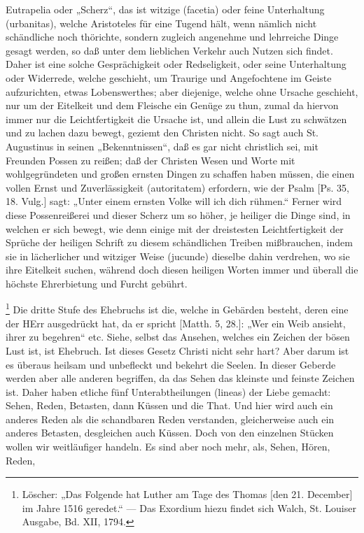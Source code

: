 Eutrapelia oder „Scherz“, das ist witzige (facetia) oder feine Unterhaltung (urbanitas), welche Aristoteles für eine Tugend hält, wenn nämlich nicht schändliche noch thörichte, sondern zugleich angenehme und lehrreiche Dinge gesagt werden, so daß unter dem lieblichen Verkehr auch Nutzen sich findet. Daher ist eine solche Gesprächigkeit oder Redseligkeit, oder seine Unterhaltung oder Widerrede, welche geschieht, um Traurige und Angefochtene im Geiste aufzurichten, etwas Lobenswerthes; aber diejenige, welche ohne Ursache geschieht, nur um der Eitelkeit und dem Fleische ein Genüge zu thun, zumal da hiervon immer nur die Leichtfertigkeit die Ursache ist, und allein die Lust zu schwätzen und zu lachen dazu bewegt, geziemt den Christen nicht. So sagt auch St. Augustinus in seinen „Bekenntnissen“, daß es gar nicht christlich sei, mit Freunden Possen zu reißen; daß der Christen Wesen und Worte mit wohlgegründeten und großen ernsten Dingen zu schaffen haben müssen, die einen vollen Ernst und Zuverlässigkeit (autoritatem) erfordern, wie der Psalm [Ps. 35, 18. Vulg.] sagt: „Unter einem ernsten Volke will ich dich rühmen.“ Ferner wird diese Possenreißerei und dieser Scherz um so höher, je heiliger die Dinge sind, in welchen er sich bewegt, wie denn einige mit der dreistesten Leichtfertigkeit der Sprüche der heiligen Schrift zu diesem schändlichen Treiben mißbrauchen, indem sie in lächerlicher und witziger Weise (jucunde) dieselbe dahin verdrehen, wo sie ihre Eitelkeit suchen, während doch diesen heiligen Worten immer und überall die höchste Ehrerbietung und Furcht gebührt.

\footnote{Löscher: „Das Folgende hat Luther am Tage des Thomas [den 21. December] im Jahre 1516 geredet.“ — Das Exordium hiezu findet sich Walch, St. Louiser Ausgabe, Bd. XII, 1794.} Die dritte Stufe des Ehebruchs ist die, welche in Gebärden besteht, deren eine der HErr ausgedrückt hat, da er spricht [Matth. 5, 28.]: „Wer ein Weib ansieht, ihrer zu begehren“ etc. Siehe, selbst das Ansehen, welches ein Zeichen der bösen Lust ist, ist Ehebruch. Ist dieses Gesetz Christi nicht sehr hart? Aber darum ist es überaus heilsam und unbefleckt und bekehrt die Seelen. In dieser Geberde werden aber alle anderen begriffen, da das Sehen das kleinste und feinste Zeichen ist. Daher haben etliche fünf Unterabtheilungen (lineas) der Liebe gemacht: Sehen, Reden, Betasten, dann Küssen und die That. Und hier wird auch ein anderes Reden als die schandbaren Reden verstanden, gleicherweise auch ein anderes Betasten, desgleichen auch Küssen. Doch von den einzelnen Stücken wollen wir weitläufiger handeln. Es sind aber noch mehr, als, Sehen, Hören, Reden,

